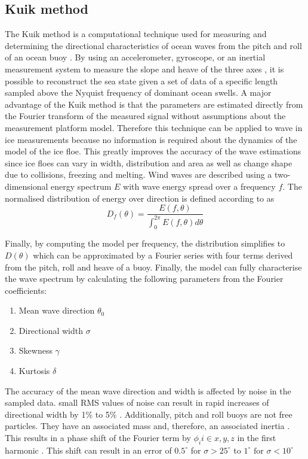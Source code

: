 \subsection{Kuik method}
\label{kuik}
The Kuik method is a computational technique used for measuring and determining the directional characteristics of ocean waves from the pitch and roll of an ocean buoy \cite{kuik1988method}. By using an accelerometer, gyroscope, or an inertial measurement system to measure the slope and heave of the three axes \cite{kuik1988method}, it is possible to reconstruct the sea state given a set of data of a specific length sampled above the Nyquist frequency of dominant ocean swells. A major advantage of the Kuik method is that the parameters are estimated directly from the Fourier transform of the measured signal \cite{kuik1988method} without assumptions about the measurement platform model. Therefore this technique can be applied to wave in ice measurements because no information is required about the dynamics of the model of the ice floe. This greatly improves the accuracy of the wave estimations since ice floes can vary in width, distribution and area as well as change shape due to collisions, freezing and melting. Wind waves are described using a two-dimensional energy spectrum $E$ with wave energy spread over a frequency $f$. The normalised distribution of energy over direction is defined according to \textcite{kuik1988method} as
\begin{equation}
	D_f(\theta) = \frac{E(f,\theta)}{\int_0^{2
			\pi}E(f,\theta)d\theta}
\end{equation} 

Finally, by computing the model per frequency, the distribution simplifies to $D(\theta)$ which can be approximated by a Fourier series with four terms \cite{kuik1988method} derived from the pitch, roll and heave of a buoy. Finally, the model can fully characterise the wave spectrum by calculating the following parameters from the Fourier coefficients:

\begin{enumerate}
	\item Mean wave direction $\theta_0$
	\item Directional width $\sigma$
	\item Skewness $\gamma$
	\item Kurtosis $\delta$ 
\end{enumerate}

The accuracy of the mean wave direction and width is affected by noise in the sampled data. small RMS values of noise can result in rapid increases of directional width by 1\% to 5\% \cite{kuik1988method}. Additionally, pitch and roll buoys are not free particles. They have an associated mass and, therefore, an associated inertia \cite{kuik1988method}. This results in a phase shift of the Fourier term by $\phi_i i \in {x,y,z}$  in the first harmonic \cite{kuik1988method}. This shift can result in an error of $0.5^\circ $ for $\sigma > 25 ^\circ $ to $1^\circ \text{ for } \sigma < 10^\circ $ \cite{kuik1988method}   

